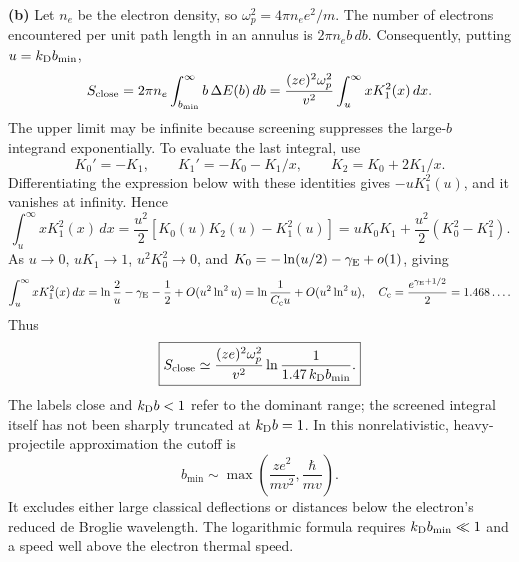 \textbf{(b)} Let $n_e$ be the electron density, so
$\omega_p^2=4\pi n_e e^2/m$. The number of electrons encountered per
unit path length in an annulus is $2\pi n_e b\,db$. Consequently, putting
$u=k_{\rm D}b_{\min}$,
\[
 S_{\rm close}=2\pi n_e\int_{b_{\min}}^\infty b\,\Delta E(b)\,db
 =\frac{(ze)^2\omega_p^2}{v^2}\int_u^\infty xK_1^2(x)\,dx.
\]
The upper limit may be infinite because screening suppresses the
large-$b$ integrand exponentially. To evaluate the last integral, use
\[
 K_0'=-K_1,\qquad K_1'=-K_0-K_1/x,\qquad
 K_2=K_0+2K_1/x.
\]
Differentiating the expression below with these identities gives
$-uK_1^2(u)$, and it vanishes at infinity. Hence
\[
 \int_u^\infty xK_1^2(x)\,dx
 =\frac{u^2}{2}\left[K_0(u)K_2(u)-K_1^2(u)\right]
 =uK_0K_1+\frac{u^2}{2}(K_0^2-K_1^2).
\]
As $u\to0$, $uK_1\to1$, $u^2K_0^2\to0$, and
$K_0=-\ln(u/2)-\gamma_{\rm E}+o(1)$, giving
\[
 \int_u^\infty xK_1^2(x)\,dx
 =\ln\frac2u-\gamma_{\rm E}-\frac12
   +O(u^2\ln^2u)
 =\ln\frac1{C_{\rm c}u}+O(u^2\ln^2u),
 \quad
 C_{\rm c}=\frac{e^{\gamma_{\rm E}+1/2}}2=1.468\ldots .
\]
Thus
\[
 \boxed{S_{\rm close}\simeq
 \frac{(ze)^2\omega_p^2}{v^2}
 \ln\frac1{1.47\,k_{\rm D}b_{\min}}.}
\]
The labels close and $k_{\rm D}b<1$ refer to the dominant range;
the screened integral itself has not been sharply truncated at
$k_{\rm D}b=1$. In this nonrelativistic, heavy-projectile approximation
the cutoff is
\[
 b_{\min}\sim\max\left(\frac{ze^2}{mv^2},\frac{\hbar}{mv}\right).
\]
It excludes either large classical deflections or distances below the
electron's reduced de Broglie wavelength. The logarithmic formula
requires $k_{\rm D}b_{\min}\ll1$ and a speed well above the electron
thermal speed.







